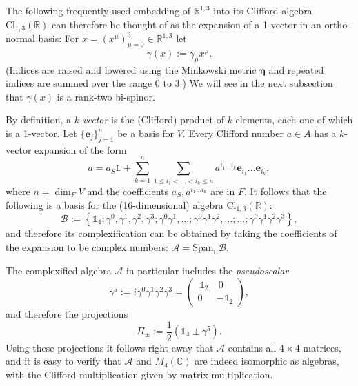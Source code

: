 \documentclass[11pt]{article}
\theoremstyle{definition}
\numberwithin{equation}{section}
\newcommand{\be}{\mathbf{e}}
\newcommand{\beq}{\begin{equation}}
\newcommand{\eeq}{\end{equation}}
\newcommand{\Id}{\mathds{1}}
\newcommand{\cA}{\mathcal{A}}
\newcommand{\cB}{\mathcal{B}}
\newcommand{\Cset}{{\mathbb C}}
\newcommand{\Rset}{{\mathbb R}}
\newcommand{\ga}{\gamma}
\newcommand{\half}{\frac{1}{2}}
\newcommand{\Span}{\mbox{Span}}
\begin{document}
The following frequently-used embedding of $\Rset^{1,3}$ into its Clifford algebra $\mbox{Cl}_{1,3}(\Rset)$ can therefore be 
thought of as the expansion of a 1-vector in an ortho-normal basis:  For $x = (x^\mu)_{\mu=0}^3 \in \Rset^{1,3}$ let 
\beq\label{embed}
\ga(x) := \ga_\mu x^\mu.
\eeq 
(Indices are raised and lowered using the Minkowski metric $\boldsymbol{\eta}$ and repeated indices are summed over the range 0 to 3.)
 We will see in the next subsection that $\ga(x)$ is a rank-two bi-spinor.  

 By definition, a {\em $k$-vector} is the (Clifford) product of $k$ elements, each one of which is a 1-vector. 
 Let $\{\be_j\}_{j=1}^n$ be a basis for $V$. Every Clifford number $a\in A$ has a $k$-vector expansion of the form 
\beq a = a_S\Id + \sum_{k=1}^{n}\sum_{1\leq i_1<\dots<i_k\leq n} a^{i_1\dots i_k} \be_{i_1}\dots\be_{i_k},
\eeq
where $n=\dim_F V$ and the coefficients $a_S,a^{i_1\dots i_k}$ are in $F$.  
 It follows that the following is a basis for the (16-dimensional) algebra $\mbox{Cl}_{1,3}(\Rset)$:
\beq\label{basis}
\cB := \left\{ \mathds{1}_4; \ga^0, \ga^1, \ga^2,\ga^3; \ga^0\ga^1, \dots; \ga^0\ga^1\ga^2, \dots;\dots;\ga^0\ga^1\ga^2\ga^3 \right\},
\eeq
and therefore its complexification can be obtained by taking the coefficients of the expansion to be complex numbers: $\cA = \Span_\Cset \cB$.  

 The complexified algebra $\cA$ in particular includes the {\em pseudoscalar}
\beq 
\ga^5 := i \ga^0 \ga^1 \ga^2 \ga^3 
= \begin{pmatrix} \, \Id_2 & \ 0 \\ 0 & -\Id_2\end{pmatrix},
\eeq
and therefore the projections
\beq\label{def:projections}
\Pi_\pm := \half( \Id_4 \pm \ga^5).
\eeq
Using these projections it follows right away that $\cA$ contains all $4\times 4$ matrices, 
and it is easy to verify that $\cA$ and $M_4(\Cset)$ are indeed isomorphic as algebras, with the 
Clifford multiplication given by matrix multiplication.
\end{document}
